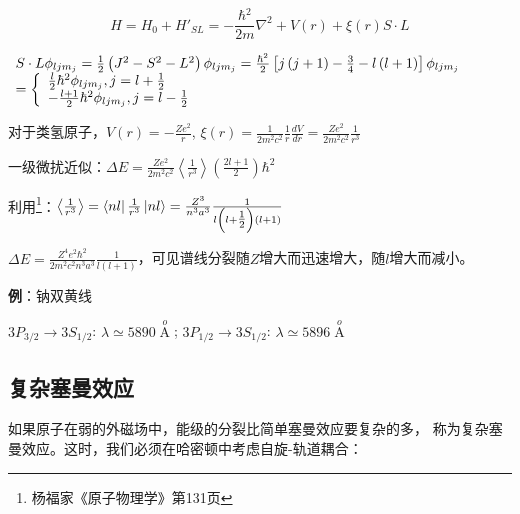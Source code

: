 \begin{equation}\label{30-7}
H = H_0  + H'_{SL}  =  - \frac{{\hbar {}^2}}{{2m}}\nabla ^2  + V\left( r \right) + \xi \left( r \right)S \cdot L
\end{equation}


$\begin{array}{l}
 S \cdot L\phi _{ljm_j }  = \frac{1}{2}\left( {J^2  - S^2  - L^2 } \right)\phi _{ljm_j }  = \frac{{\hbar ^2 }}{2}\left[ {j\left( {j + 1} \right) - \frac{3}{4} - l\left( {l + 1} \right)} \right]\phi _{ljm_j }  \\
  = \left\{ \begin{array}{l}
 \frac{l}{2}\hbar ^2 \phi _{ljm_j } ,j = l + {\textstyle{1 \over 2}} \\
  - \frac{{l + 1}}{2}\hbar ^2 \phi _{ljm_j } ,j = l - {\textstyle{1 \over 2}} \\
 \end{array} \right. \\
 \end{array}$


对于类氢原子，$V(r) =  - \frac{{Ze^2 }}{r}$, $\xi \left( r \right) = \frac{1}{{2m^2 c^2 }}\frac{1}{r}\frac{{dV}}{{dr}} = \frac{{Ze^2 }}{{2m^2 c^2 }}\frac{1}{{r^3 }}$


一级微扰近似：$\Delta E = \frac{{Ze^2 }}{{2m^2 c^2 }}\left\langle {\frac{1}{{r^3 }}} \right\rangle \left( {\frac{{2l + 1}}{2}} \right)\hbar ^2 $

利用\footnote{杨福家《原子物理学》第131页}：$\left\langle
{\frac{1}{{r^3 }}} \right\rangle  = \left\langle {nl}
\right|\frac{1}{{r^3 }}\left| {nl} \right\rangle  = \frac{{Z^3
}}{{n^3 a^3 }}\frac{1}{{l\left( {l + {\textstyle{1 \over 2}}}
\right)\left( {l + 1} \right)}}$


$\Delta E = \frac{{Z^4 e^2 \hbar ^2 }}{{2m^2 c^2 n^3 a^3 }}\frac{1}{{l\left( {l + 1} \right)}}$，可见谱线分裂随$Z$增大而迅速增大，随$l$增大而减小。



\textbf{例}：钠双黄线

$3P_{3/2}  \to 3S_{1/2} $: $\lambda  \simeq 5890\mathop A\limits^o $; $3P_{1/2}  \to 3S_{1/2} $: $\lambda  \simeq 5896\mathop A\limits^o $


\subsection{复杂塞曼效应}

如果原子在弱的外磁场中，能级的分裂比简单塞曼效应要复杂的多，
称为复杂塞曼效应。这时，我们必须在哈密顿中考虑自旋-轨道耦合：

